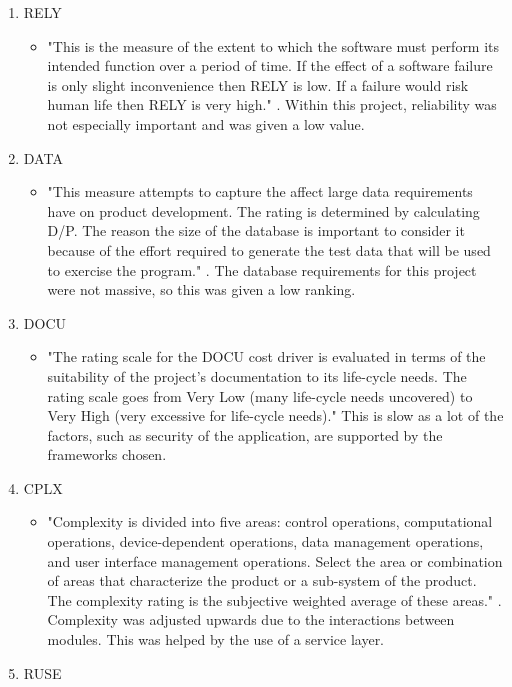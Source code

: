 \begin{enumerate}
\item RELY
\begin{itemize}
\item "This is the measure of the extent to which the software must perform its intended function over a period of time. If the effect of a software failure is only slight inconvenience then RELY is low. If a failure would risk human life then RELY is very high." \parencite{coco}. Within this project, reliability was not especially important and was given a low value.
\end{itemize}
\item DATA
\begin{itemize}
\item "This measure attempts to capture the affect large data requirements have on product development. The rating is determined by calculating D/P. The reason the size of the database is important to consider it because of the effort required to generate the test data that will be used to exercise the program." \parencite{coco}. The database requirements for this project were not massive, so this was given a low ranking.
\end{itemize}
\item DOCU
\begin{itemize}
\item "The rating scale for the DOCU cost driver is evaluated in terms of the suitability of the project's documentation to its life-cycle needs. The rating scale goes from Very Low (many life-cycle needs uncovered) to Very High (very excessive for life-cycle needs)." This is slow as a lot of the factors, such as security of the application, are supported by the frameworks chosen.
\end{itemize}
\item CPLX
\begin{itemize}
\item "Complexity is divided into five areas: control operations, computational operations, device-dependent operations, data management operations, and user interface management operations. Select the area or combination of areas that characterize the product or a sub-system of the product. The complexity rating is the subjective weighted average of these areas." \parencite{coco}. Complexity was adjusted upwards due to the interactions between modules. This was helped by the use of a service layer.
\end{itemize}
\item RUSE
\begin{itemize}

\end{itemize}
\end{enumerate}
